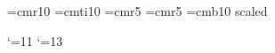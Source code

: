 


\loadeufm

\font\dotless=cmr10 %
\font\itdotless=cmti10
\def\itumi{{\"{\itdotless\char'020}}}
\def\itumj{{\"{\itdotless\char'021}}}
\def\umi{{\"{\dotless\char'020}}}
\def\umj{{\"{\dotless\char'021}}}
\font\thinlinefont=cmr5
\font\smaller=cmr5
\font\boldtitlefont=cmb10 scaled

\NoRunningHeads
{}
\loadeusm

\catcode`\@=11
\def\logo@{}
\catcode`\@=13

\def\eps{{\varepsilon}}

\def\undertext#1{$\underline{\vphantom{y}\hbox{#1}}$}
\def\nspace{\lineskip=1pt\baselineskip=12pt%
     \lineskiplimit=0pt}
\def\dspace{\lineskip=2pt\baselineskip=18pt%
     \lineskiplimit=0pt}

\def\w{{\mathchoice{\,{\scriptstyle\wedge}\,}
  {{\scriptstyle\wedge}}
  {{\scriptscriptstyle\wedge}}{{\scriptscriptstyle\wedge}}}}
\def\Le{{\mathchoice{\,{\scriptstyle\le}\,}
{\,{\scriptstyle\le}\,}
{\,{\scriptscriptstyle\le}\,}{\,{\scriptscriptstyle\le}\,}}}
\def\Ge{{\mathchoice{\,{\scriptstyle\ge}\,}
{\,{\scriptstyle\ge}\,}
{\,{\scriptscriptstyle\ge}\,}{\,{\scriptscriptstyle\ge}\,}}}
\def\uphat{{\hat{\phantom{a}}}}
\def\upvee{{\sssize \vee}}
\def\plus{{\sssize +}}

\def\Spin{\text{\rm Spin}}
\def\Id{\text{\rm Id}} 
\def\Sp{\text{\rm Sp}}
\def\SO{\text{\rm SO}}
\def\Tr{\text{\rm Tr}}
\def\Supp{\text{\rm Supp}}
\def\cl{\text{c}\ell}


